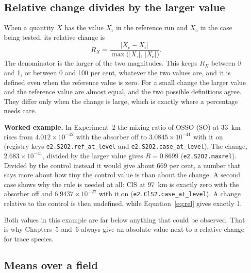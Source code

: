 \subsection{Relative change divides by the larger value}
\label{sec:conv-rel}

When a quantity $X$ has the value $X_{\mathrm{r}}$ in the reference run and
$X_{\mathrm{c}}$ in the case being tested, its relative change is
\begin{equation}
  R_X = \frac{|X_{\mathrm{c}} - X_{\mathrm{r}}|}
             {\max\big(|X_{\mathrm{r}}|,\,|X_{\mathrm{c}}|\big)} .
  \label{eq:rel}
\end{equation}
The denominator is the larger of the two magnitudes. This keeps $R_X$ between 0 and 1,
or between 0 and 100 per cent, whatever the two values are, and it is defined even when
the reference value is zero. For a small change the larger value and the reference
value are almost equal, and the two possible definitions agree. They differ only when
the change is large, which is exactly where a percentage needs care.

\textbf{Worked example.} In Experiment~2 the mixing ratio of OSSO (SO) at
33~km rises from $4.012\times10^{-42}$ with the absorber off to $3.0845\times10^{-41}$
with it on (registry keys \texttt{e2.S2O2.ref\_at\_level} and
\texttt{e2.S2O2.case\_at\_level}). The change, $2.683\times10^{-41}$, divided by the
larger value gives $R = 0.8699$ (\texttt{e2.S2O2.maxrel}). Divided by the control
instead it would give about 669 per cent, a number that says more about how tiny the
control value is than about the change. A second case shows why the rule is needed at
all: ClS at 97~km is exactly zero with the absorber off and
$6.9437\times10^{-27}$ with it on (\texttt{e2.ClS2.case\_at\_level}). A change relative
to the control is then undefined, while Equation~\eqref{eq:rel} gives exactly 1.

Both values in this example are far below anything that could be observed. That is why
Chapters~5 and~6 always give an absolute value next to a relative change for trace
species.

\subsection{Means over a field}
\label{sec:conv-mean}

